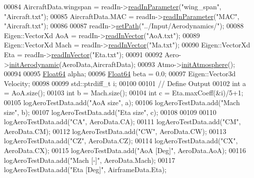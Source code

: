 \begin{DoxyCode}
00084     AircraftData.wingspan   = readIn->\hyperlink{classread_in_data_a9ae979e74958b43424cb6cf4a22043d7}{readInParameter}(\textcolor{stringliteral}{"wing\_span"}, \textcolor{stringliteral}{"Aircraft.txt"});
00085     AircraftData.MAC        = readIn->\hyperlink{classread_in_data_a9ae979e74958b43424cb6cf4a22043d7}{readInParameter}(\textcolor{stringliteral}{"MAC"}, \textcolor{stringliteral}{"Aircraft.txt"});
00086 
00087     readIn->\hyperlink{classread_in_data_ad67d566fd837f6d721db279144d484e0}{setPath}(\textcolor{stringliteral}{"../Input/Aerodynamics/"});
00088     Eigen::VectorXd AoA     = readIn->\hyperlink{classread_in_data_ab57aff38529234593d786ecace301cf7}{readInVector}(\textcolor{stringliteral}{"AoA.txt"});
00089     Eigen::VectorXd Mach    = readIn->\hyperlink{classread_in_data_ab57aff38529234593d786ecace301cf7}{readInVector}(\textcolor{stringliteral}{"Ma.txt"});
00090     Eigen::VectorXd Eta     = readIn->\hyperlink{classread_in_data_ab57aff38529234593d786ecace301cf7}{readInVector}(\textcolor{stringliteral}{"Eta.txt"});
00091 
00092     Aero->\hyperlink{group___aerodynamic_aa4fee96e5b485cac47b3bc2127a6d4e2}{initAerodynamic}(AeroData,AircraftData);
00093     Atmo->\hyperlink{group___atmosphere_a6e1d5763fbb6631784c99ee3c88911bd}{initAtmosphere}();
00094 
00095     \hyperlink{group___tools_ga3f1431cb9f76da10f59246d1d743dc2c}{Float64} alpha;
00096     \hyperlink{group___tools_ga3f1431cb9f76da10f59246d1d743dc2c}{Float64} beta = 0.0;
00097     Eigen::Vector3d Velocity;
00098 
00099     std::ptrdiff\_t i;
00100 
00101     \textcolor{comment}{// Define Output}
00102     \textcolor{keywordtype}{int} a = AoA.size();
00103     \textcolor{keywordtype}{int} b = Mach.size();
00104     \textcolor{keywordtype}{int} c = Eta.maxCoeff(&i)/5+1;
00105     logAeroTestData.add(\textcolor{stringliteral}{"AoA size"}, a);
00106     logAeroTestData.add(\textcolor{stringliteral}{"Mach size"}, b);
00107     logAeroTestData.add(\textcolor{stringliteral}{"Eta size"}, c);
00108     
00109     
00110     logAeroTestData.add(\textcolor{stringliteral}{"CA"}, AeroData.CA);
00111     logAeroTestData.add(\textcolor{stringliteral}{"CM"}, AeroData.CM);
00112     logAeroTestData.add(\textcolor{stringliteral}{"CW"}, AeroData.CW);
00113     logAeroTestData.add(\textcolor{stringliteral}{"CZ"}, AeroData.CZ);
00114     logAeroTestData.add(\textcolor{stringliteral}{"CX"}, AeroData.CX);
00115     logAeroTestData.add(\textcolor{stringliteral}{"AoA [Deg]"}, AeroData.AoA);
00116     logAeroTestData.add(\textcolor{stringliteral}{"Mach [-]"}, AeroData.Mach);
00117     logAeroTestData.add(\textcolor{stringliteral}{"Eta [Deg]"}, AirframeData.Eta);

\end{DoxyCode}
